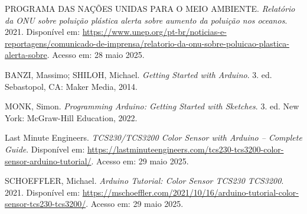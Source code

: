 \documentclass[12pt]{article}
\begin{document}
\begin{thebibliography}{99}
PROGRAMA DAS NAÇÕES UNIDAS PARA O MEIO AMBIENTE. \textit{Relatório da ONU sobre poluição plástica alerta sobre aumento da poluição nos oceanos}. 2021. Disponível em: \url{https://www.unep.org/pt-br/noticias-e-reportagens/comunicado-de-imprensa/relatorio-da-onu-sobre-poluicao-plastica-alerta-sobre}. Acesso em: 28 maio 2025.

BANZI, Massimo; SHILOH, Michael. \textit{Getting Started with Arduino}. 3. ed. Sebastopol, CA: Maker Media, 2014.

MONK, Simon. \textit{Programming Arduino: Getting Started with Sketches}. 3. ed. New York: McGraw-Hill Education, 2022.

Last Minute Engineers. \emph{TCS230/TCS3200 Color Sensor with Arduino – Complete Guide}. Disponível em: \url{https://lastminuteengineers.com/tcs230-tcs3200-color-sensor-arduino-tutorial/}. Acesso em: 29 maio 2025.

SCHOEFFLER, Michael. \emph{Arduino Tutorial: Color Sensor TCS230 TCS3200}. 2021. Disponível em: \url{https://mschoeffler.com/2021/10/16/arduino-tutorial-color-sensor-tcs230-tcs3200/}. Acesso em: 29 maio 2025.

\end{thebibliography}
\end{document}
